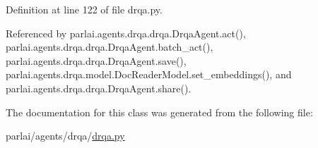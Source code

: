 Definition at line 122 of file drqa.\+py.



Referenced by parlai.\+agents.\+drqa.\+drqa.\+Drqa\+Agent.\+act(), parlai.\+agents.\+drqa.\+drqa.\+Drqa\+Agent.\+batch\+\_\+act(), parlai.\+agents.\+drqa.\+drqa.\+Drqa\+Agent.\+save(), parlai.\+agents.\+drqa.\+model.\+Doc\+Reader\+Model.\+set\+\_\+embeddings(), and parlai.\+agents.\+drqa.\+drqa.\+Drqa\+Agent.\+share().



The documentation for this class was generated from the following file\+:\begin{DoxyCompactItemize}
\item 
parlai/agents/drqa/\hyperlink{drqa_8py}{drqa.\+py}\end{DoxyCompactItemize}
